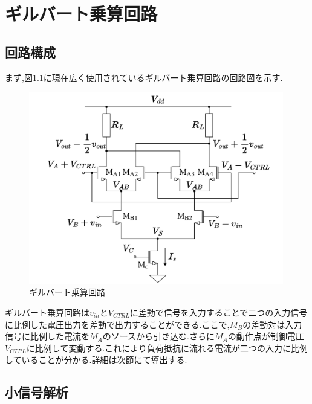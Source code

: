 \chapter{ギルバート乗算回路}
    \section{回路構成}
        まず,図\ref{fig:2_gilbert}に現在広く使用されているギルバート乗算回路の回路図を示す.
        \begin{figure}[!b]
            \begin{center}
                \includegraphics[width=0.99\textwidth]{figures/chapter2/gilbert.pdf}
                \caption{ギルバート乗算回路}
                \label{fig:2_gilbert}
            \end{center}
        \end{figure}
        ギルバート乗算回路は$v_{in}$と$V_{CTRL}$に差動で信号を入力することで二つの入力信号に比例した電圧出力を差動で出力することができる.ここで,$M_{B}$の差動対は入力信号に比例した電流を$M_{A}$のソースから引き込む.さらに$M_{A}$の動作点が制御電圧$V_{CTRL}$に比例して変動する.これにより負荷抵抗に流れる電流が二つの入力に比例していることが分かる.詳細は次節にて導出する.


    \section{小信号解析}
